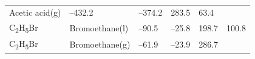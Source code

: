 \documentclass[
  9pt,
]{extbook}
\theoremstyle{definition}
\theoremstyle{definition}
\theoremstyle{definition}
\theoremstyle{remark}
\begin{document}
\begin{longtable}[]{@{}llllll@{}}
\begin{minipage}[t]{0.17\columnwidth}
Acetic acid(g)\strut
\end{minipage} & \begin{minipage}[t]{0.15\columnwidth}\raggedright
--432.2\strut
\end{minipage} & \begin{minipage}[t]{0.15\columnwidth}\raggedright
--374.2\strut
\end{minipage} & \begin{minipage}[t]{0.14\columnwidth}\raggedright
283.5\strut
\end{minipage} & \begin{minipage}[t]{0.14\columnwidth}\raggedright
63.4\strut
\end{minipage}\tabularnewline
\begin{minipage}[t]{0.07\columnwidth}\raggedright
C\textsubscript{2}H\textsubscript{5}Br\strut
\end{minipage} & \begin{minipage}[t]{0.17\columnwidth}\raggedright
Bromoethane(l)\strut
\end{minipage} & \begin{minipage}[t]{0.15\columnwidth}\raggedright
--90.5\strut
\end{minipage} & \begin{minipage}[t]{0.15\columnwidth}\raggedright
--25.8\strut
\end{minipage} & \begin{minipage}[t]{0.14\columnwidth}\raggedright
198.7\strut
\end{minipage} & \begin{minipage}[t]{0.14\columnwidth}\raggedright
100.8\strut
\end{minipage}\tabularnewline
\begin{minipage}[t]{0.07\columnwidth}\raggedright
C\textsubscript{2}H\textsubscript{5}Br\strut
\end{minipage} & \begin{minipage}[t]{0.17\columnwidth}\raggedright
Bromoethane(g)\strut
\end{minipage} & \begin{minipage}[t]{0.15\columnwidth}\raggedright
--61.9\strut
\end{minipage} & \begin{minipage}[t]{0.15\columnwidth}\raggedright
--23.9\strut
\end{minipage} & \begin{minipage}[t]{0.14\columnwidth}\raggedright
286.7\strut
\end{minipage} & \begin{minipage}[t]{0.14\columnwidth}\raggedright

\end{minipage}
\end{longtable}
\end{document}
